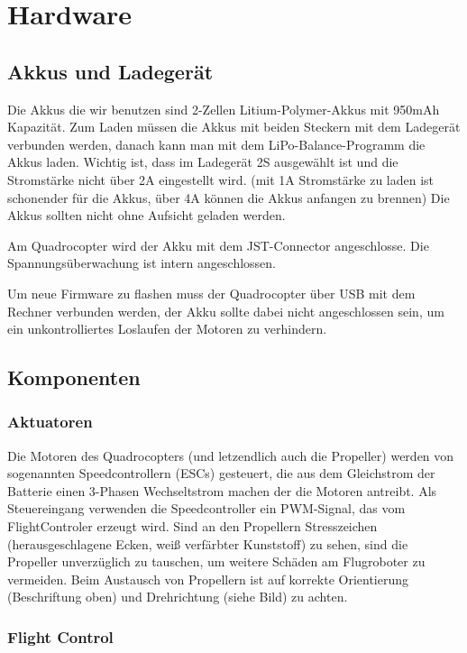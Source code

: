 \section{Hardware}

\subsection{Akkus und Ladegerät}
Die Akkus die wir benutzen sind 2-Zellen Litium-Polymer-Akkus mit 950mAh Kapazität.
Zum Laden müssen die Akkus mit beiden Steckern mit dem Ladegerät verbunden werden, danach kann man mit dem LiPo-Balance-Programm die Akkus laden.
Wichtig ist, dass im Ladegerät 2S ausgewählt ist und die Stromstärke nicht über 2A eingestellt wird.
(mit 1A Stromstärke zu laden ist schonender für die Akkus, über 4A können die Akkus anfangen zu brennen)
Die Akkus sollten nicht ohne Aufsicht geladen werden.

Am Quadrocopter wird der Akku mit dem JST-Connector angeschlosse. Die Spannungsüberwachung ist intern angeschlossen.

Um neue Firmware zu flashen muss der Quadrocopter über USB mit dem Rechner verbunden werden, der Akku sollte dabei nicht angeschlossen sein, um ein unkontrolliertes Loslaufen der Motoren zu verhindern.

\subsection{Komponenten}
\subsubsection{Aktuatoren}

Die Motoren des Quadrocopters (und letzendlich auch die Propeller) werden von sogenannten Speedcontrollern (ESCs) gesteuert, die aus dem Gleichstrom der Batterie einen 3-Phasen Wechseltstrom machen der die Motoren antreibt.
Als Steuereingang verwenden die Speedcontroller ein PWM-Signal, das vom FlightControler erzeugt wird.
Sind an den Propellern Stresszeichen (herausgeschlagene Ecken, weiß verfärbter Kunststoff) zu sehen, sind die Propeller unverzüglich zu tauschen, um weitere Schäden am Flugroboter zu vermeiden.
Beim Austausch von Propellern ist auf korrekte Orientierung (Beschriftung oben) und Drehrichtung (siehe Bild) zu achten.

\subsubsection{Flight Control}

